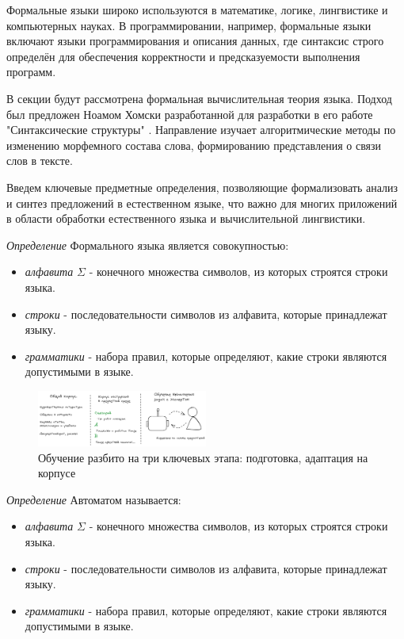 Формальные языки широко используются в математике, логике, лингвистике и компьютерных науках. 
В программировании, например, формальные языки включают языки программирования и описания данных, 
где синтаксис строго определён для обеспечения корректности и предсказуемости выполнения программ.

В секции будут рассмотрена формальная вычислительная теория языка.
Подход был предложен Ноамом Хомски разработанной для разработки
в его работе "Синтаксические структуры" \cite{chomsky2002syntactic}. Направление изучает алгоритмические 
методы по изменению морфемного состава слова, формированию представления о связи слов в тексте.

Введем ключевые предметные определения, позволяющие формализовать анализ и 
синтез предложений в естественном языке, что важно для многих приложений 
в области обработки естественного языка и вычислительной лингвистики.
 
\textit{Определение} Формального языка является совокупностью:
\begin{itemize}
    \item \textit{алфавита} $\Sigma$ - конечного множества символов, из которых строятся строки языка.
    \item \textit{строки} - последовательности символов из алфавита, которые принадлежат языку.
    \item \textit{грамматики} - набора правил, которые определяют, какие строки являются допустимыми в языке.
\end{itemize}
\begin{figure}[h]
    \centering
    \includegraphics[width=0.5\textwidth]{assets/work/arch/learning.excalidraw.png}
    \caption{Обучение разбито на три ключевых этапа: подготовка, адаптация на корпусе}
    \label{train}
\end{figure}

\textit{Определение} Автоматом называется:
\begin{itemize}
    \item \textit{алфавита} $\Sigma$ - конечного множества символов, из которых строятся строки языка.
    \item \textit{строки} - последовательности символов из алфавита, которые принадлежат языку.
    \item \textit{грамматики} - набора правил, которые определяют, какие строки являются допустимыми в языке.
\end{itemize}


